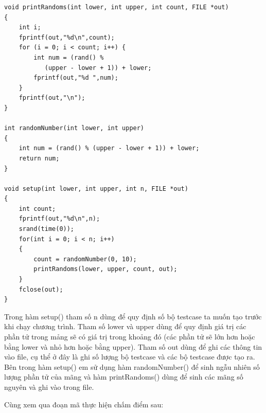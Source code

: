 \documentclass[12pt,a4paper]{report}
\begin{document}
\begin{lstlisting}
void printRandoms(int lower, int upper, int count, FILE *out) 
{ 
    int i;
    fprintf(out,"%d\n",count);
    for (i = 0; i < count; i++) { 
        int num = (rand() % 
           (upper - lower + 1)) + lower; 
        fprintf(out,"%d ",num); 
    }
    fprintf(out,"\n"); 
} 

int randomNumber(int lower, int upper)
{
    int num = (rand() % (upper - lower + 1)) + lower; 
    return num;
}

void setup(int lower, int upper, int n, FILE *out)
{
    int count;
    fprintf(out,"%d\n",n);
    srand(time(0)); 
    for(int i = 0; i < n; i++)
    {
        count = randomNumber(0, 10);
        printRandoms(lower, upper, count, out);
    } 
    fclose(out);
}
\end{lstlisting}

Trong hàm setup() tham số n dùng để quy định số bộ testcase ta muốn tạo trước khi chạy chương trình. Tham số lower và upper dùng để quy định giá trị các phần tử trong mảng sẽ có giá trị trong khoảng đó (các phần tử sẽ lớn hơn hoặc bằng lower và nhỏ hơn hoặc bằng upper). Tham số out dùng để ghi các thông tin vào file, cụ thể ở đây là ghi số lượng bộ testcase và các bộ testcase được tạo ra. Bên trong hàm setup() em sử dụng hàm randomNumber() để sinh ngẫu nhiên số lượng phần tử của mãng và hàm printRandoms() dùng để sinh các mãng số nguyên và ghi vào trong file.

Cùng xem qua đoạn mã thực hiện chấm điểm sau:
\end{document}
